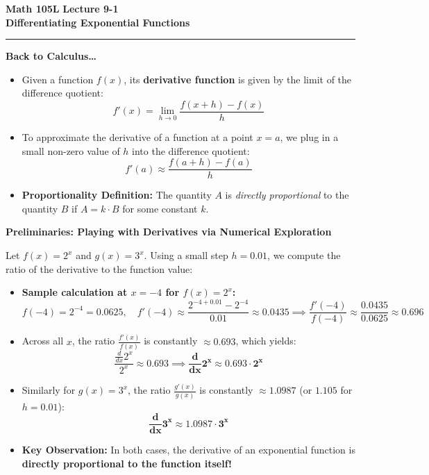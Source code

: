 \documentclass[10.5pt]{article}
\begin{document}
\noindent \textbf{\large Math 105L} \hfill \textbf{\large Lecture 9-1}\\[1pt]
{\textbf{\Large Differentiating Exponential Functions}}\\[-5pt]
\rule{\textwidth}{1.2pt}

\vspace{0.03in}

\textbf{\large Back to Calculus\dots}

\begin{itemize}[leftmargin=1.2em, topsep=1pt, itemsep=2pt]
  \item Given a function $f(x)$, its \textbf{derivative function} is given by the limit of the difference quotient:
  \[
    f'(x) = \lim_{h \to 0} \frac{f(x+h) - f(x)}{h}
  \]
  \item To approximate the derivative of a function at a point $x = a$, we plug in a small non-zero value of $h$ into the difference quotient:
  \[
    f'(a) \approx \frac{f(a+h) - f(a)}{h}
  \]
  \item \textbf{Proportionality Definition:} The quantity $A$ is \textit{directly proportional} to the quantity $B$ if $A = k \cdot B$ for some constant $k$.
\end{itemize}

\vspace{0.03in}

\textbf{\large Preliminaries: Playing with Derivatives via Numerical Exploration}

Let $f(x) = 2^x$ and $g(x) = 3^x$. Using a small step $h = 0.01$, we compute the ratio of the derivative to the function value:
\begin{itemize}[leftmargin=1.2em, label=$\bullet$, topsep=1pt, itemsep=2pt]
  \item \textbf{Sample calculation at $x = -4$ for $f(x) = 2^x$:}
  \[
    f(-4) = 2^{-4} = 0.0625, \quad f'(-4) \approx \frac{2^{-4 + 0.01} - 2^{-4}}{0.01} \approx 0.0435 \implies \frac{f'(-4)}{f(-4)} \approx \frac{0.0435}{0.0625} \approx 0.696
  \]
  \item Across all $x$, the ratio $\frac{f'(x)}{f(x)}$ is constantly $\approx 0.693$, which yields:
  \[
    \frac{\frac{d}{dx} 2^x}{2^x} \approx 0.693 \implies \mathbf{\frac{d}{dx} 2^x \approx 0.693 \cdot 2^x}
  \]
  \item Similarly for $g(x) = 3^x$, the ratio $\frac{g'(x)}{g(x)}$ is constantly $\approx 1.0987$ (or $1.105$ for $h=0.01$):
  \[
    \mathbf{\frac{d}{dx} 3^x \approx 1.0987 \cdot 3^x}
  \]
  \item \textbf{Key Observation:} In both cases, the derivative of an exponential function is \textbf{directly proportional to the function itself!}
\end{itemize}
\end{document}

